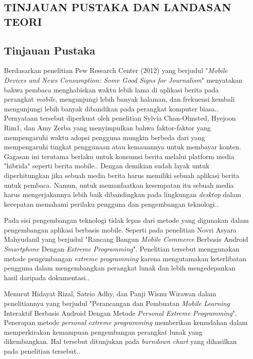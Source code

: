 \begin{spacing}{2}
\chapter{TINJAUAN PUSTAKA DAN LANDASAN TEORI}                

\section{Tinjauan Pustaka}
  Berdasarkan penelitian Pew Research Center (2012) yang berjudul "\emph{Mobile Devices and News Consumption: Some Good Signs for Journalism}" menyatakan bahwa pembaca menghabiskan waktu lebih lama di aplikasi berita pada perangkat \emph{mobile}, mengunjungi lebih banyak halaman, dan frekuensi kembali mengunjungi lebih banyak dibandikan pada perangkat komputer biasa.\cite{journalism2012}. Pernyataan tersebut diperkuat oleh penelitian Sylvia Chan-Olmsted, Hyejoon Rim1, dan Amy Zerba yang menyimpulkan bahwa faktor-faktor yang mempengaruhi waktu adopsi pengguna mungkin berbeda dari yang mempengaruhi tingkat penggunaan atau kemauannya untuk membayar konten. Gagasan ini terutama berlaku untuk konsumsi berita melalui platform media "hibrida" seperti berita mobile.\cite{sylvia2012}. Dengan demikian sudah layak untuk diperhitungkan jika sebuah media berita harus memiliki sebuah aplikasi berita untuk pembaca. Namun, untuk memanfaatkan kesempatan itu sebuah media harus mengerjakannya lebih baik dibandingkan pada lingkungan \emph{desktop} dalam kecepatan memahami perilaku pengguna dan pengembangan teknologi.\cite{journalism2012}.

  Pada sisi pengembangan teknologi tidak lepas dari metode yang digunakan dalam pengembangan aplikasi berbasis mobile. Seperti pada penelitian Novri Asyara Mahyudanil yang berjudul "Rancang Bangun \emph{Mobile Commerce} Berbasis Android \emph{Smartphone} Dengan \emph{Extreme Programming}". Penelitian tersebut menggunakan metode pengembangan \emph{extreme programming} karena mengutamakan keterlibatan pengguna dalam mengembangkan perangkat lunak dan lebih mengedepankan hasil daripada dokumentasi.\cite{commerce2014}.

  Menurut Hidayat Rizal, Satrio Adhy, dan Panji Wisnu Wirawan dalam penelitiannya yang berjudul "Perancangan dan Pembuatan \emph{Mobile Learning} Interaktif Berbasis Android Dengan Metode \emph{Personal Extreme Programming}", Penerapan metode \emph{personal extreme programming} memberikan kemudahan dalam memperkirakan kemampuan pengembangan perangkat lunak yang dikembangkan. Hal tersebut ditunjukan pada \emph{burndown chart} yang dihasilkan pada penelitian tersebut.\cite{mlearning}.


\end{spacing}
